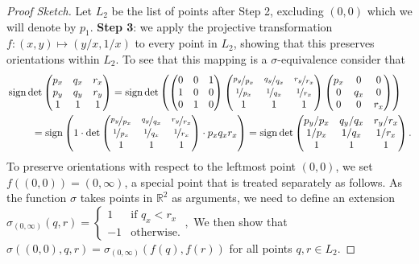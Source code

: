\begin{proof}[Proof Sketch]
Let $L_2$ be the list of points after Step 2, excluding $(0,0)$ which we will denote by $p_1$.
\textbf{Step 3}: we apply the projective transformation $f: (x, y) \mapsto (y/x, 1/x)$ to every point in $L_2$,
showing that this preserves orientations within $L_2$.
To see that this mapping is a $\sigma$-equivalence consider that
\[
\begin{multlined}
 \sign \det \begin{pmatrix} p_x & q_x & r_x \\ p_y & q_y & r_y \\ 1 & 1 & 1 \end{pmatrix} =  \sign \det \left( \begin{pmatrix} 0 & 0 & 1 \\ 1 & 0 & 0\\ 0 & 1 & 0 \end{pmatrix}  \begin{pmatrix} \nicefrac{p_y}{p_x} & \nicefrac{q_y}{q_x} & \nicefrac{r_y}{r_x} \\ \nicefrac{1}{p_x} & \nicefrac{1}{q_x} & \nicefrac{1}{r_x} \\ 1 & 1 & 1 \end{pmatrix}  \begin{pmatrix} p_x & 0 & 0 \\ 0 & q_x & 0\\ 0 & 0 & r_x \end{pmatrix} \right)\\
                        = \sign \left(1 \cdot \det  \begin{pmatrix} \nicefrac{p_y}{p_x} & \nicefrac{q_y}{q_x} & \nicefrac{r_y}{r_x} \\ \nicefrac{1}{p_x} & \nicefrac{1}{q_x} & \nicefrac{1}{r_x} \\ 1 & 1 & 1 \end{pmatrix} \cdot  p_x q_x r_x  \right) = \sign \det \begin{pmatrix} p_y/p_x & q_y/q_x & r_y/r_x \\ 1/p_x & 1/q_x & 1/r_x \\ 1 & 1 & 1 \end{pmatrix}.
\end{multlined}
\]
To preserve orientations with respect to the leftmost point $(0, 0)$, we set $f( (0, 0)) = (0, \infty)$,
a special point that is treated separately as follows.
As the function $\sigma$ takes points in $\mathbb{R}^2$ as arguments,
we need to define an extension
\(
  \sigma_{(0, \infty)}(q, r) = \begin{cases}
    1 & \text{if } q_x < r_x \\
    -1 & \text{otherwise}.  
  \end{cases},
\)
We then show that $\sigma((0, 0), q, r) = \sigma_{(0, \infty)}(f(q), f(r))$ for all points $q, r \in L_2$. 


\end{proof}
